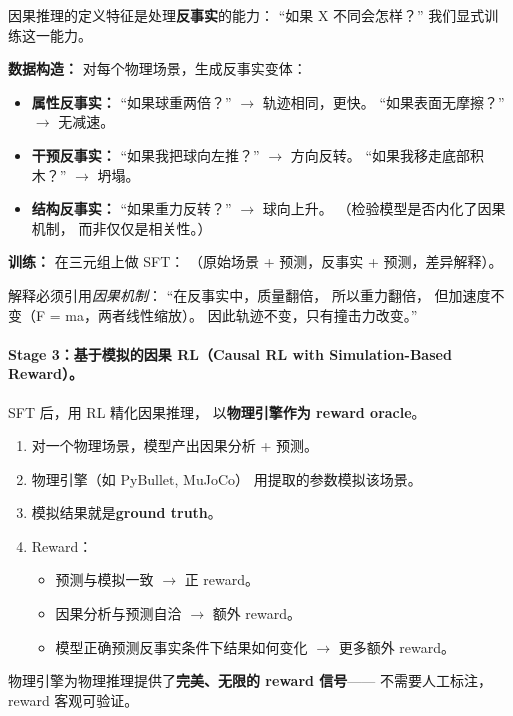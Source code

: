 \documentclass[12pt,a4paper]{article}
\begin{document}
因果推理的定义特征是处理\textbf{反事实}的能力：
``如果 X 不同会怎样？''
我们显式训练这一能力。

\textbf{数据构造：}
对每个物理场景，生成反事实变体：
\begin{itemize}[leftmargin=2em]
  \item \textbf{属性反事实：}
    ``如果球重两倍？''
    $\rightarrow$ 轨迹相同，更快。
    ``如果表面无摩擦？''
    $\rightarrow$ 无减速。
  \item \textbf{干预反事实：}
    ``如果我把球向左推？''
    $\rightarrow$ 方向反转。
    ``如果我移走底部积木？''
    $\rightarrow$ 坍塌。
  \item \textbf{结构反事实：}
    ``如果重力反转？''
    $\rightarrow$ 球向上升。
    （检验模型是否内化了因果机制，
    而非仅仅是相关性。）
\end{itemize}

\textbf{训练：}
在三元组上做 SFT：
（原始场景 + 预测，反事实 + 预测，差异解释）。

解释必须引用\textit{因果机制}：
``在反事实中，质量翻倍，
所以重力翻倍，
但加速度不变（F = ma，两者线性缩放）。
因此轨迹不变，只有撞击力改变。''

\paragraph{Stage 3：基于模拟的因果 RL（Causal RL with Simulation-Based Reward）。}

SFT 后，用 RL 精化因果推理，
以\textbf{物理引擎作为 reward oracle}。

\begin{enumerate}[leftmargin=2em]
  \item 对一个物理场景，模型产出因果分析 + 预测。
  \item 物理引擎（如 PyBullet, MuJoCo）
    用提取的参数模拟该场景。
  \item 模拟结果就是\textbf{ground truth}。
  \item Reward：
    \begin{itemize}
      \item 预测与模拟一致 $\rightarrow$ 正 reward。
      \item 因果分析与预测自洽 $\rightarrow$ 额外 reward。
      \item 模型正确预测反事实条件下结果如何变化
        $\rightarrow$ 更多额外 reward。
    \end{itemize}
\end{enumerate}

\noindent
物理引擎为物理推理提供了\textbf{完美、无限的 reward 信号}——
不需要人工标注，reward 客观可验证。
\end{document}
